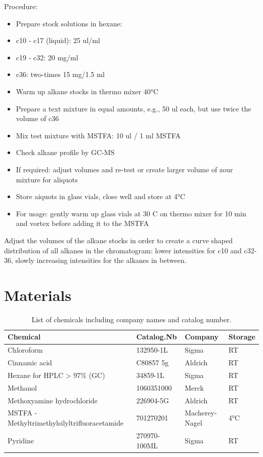 \documentclass[]{book}
\providecommand{\tightlist}{%
  \setlength{\itemsep}{0pt}\setlength{\parskip}{0pt}}
\begin{document}
Procedure:

\begin{itemize}
\tightlist
\item
  Prepare stock solutions in hexane:
\item
  c10 - c17 (liquid): 25 ul/ml
\item
  c19 - c32: 20 mg/ml
\item
  c36: two-times 15 mg/1.5 ml
\item
  Warm up alkane stocks in thermo mixer 40°C
\item
  Prepare a text mixture in equal amounts, e.g., 50 ul each, but use
  twice the volume of c36
\item
  Mix test mixture with MSTFA: 10 ul / 1 ml MSTFA
\item
  Check alkane profile by GC-MS
\item
  If required: adjust volumes and re-test or create larger volume of
  zour mixture for aliquots
\item
  Store aiquots in glass vials, close well and store at 4°C
\item
  For usage: gently warm up glass vials at 30 C on thermo mixer for 10
  min and vortex before adding it to the MSTFA
\end{itemize}

Adjust the volumes of the alkane stocks in order to create a curve
shaped distribution of all alkanes in the chromatogram: lower
intensities for c10 and c32-36, slowly increasing intensities for the
alkanes in between.

\section{Materials}\label{materials}

\begin{table}[t]

\caption{\label{tab:chemicals}List of chemicals including company names and catalog number.}
\centering
\begin{tabular}{llll}
\toprule
Chemical & Catalog.Nb & Company & Storage\\
\midrule
Chloroform & 132950-1L & Sigma & RT\\
Cinnamic acid & C80857  5g & Aldrich & RT\\
Hexane for HPLC > 97\% (GC) & 34859-1L & Sigma & RT\\
Methanol & 1060351000 & Merck & RT\\
Methoxyamine hydrochloride & 226904-5G & Aldrich & RT\\
\addlinespace
MSTFA - Methyltrimethylsilyltrifluoracetamide & 701270201 & Macherey-Nagel & 4°C\\
Pyridine & 270970-100ML & Sigma & RT\\
\bottomrule
\end{tabular}
\end{table}


\end{document}

